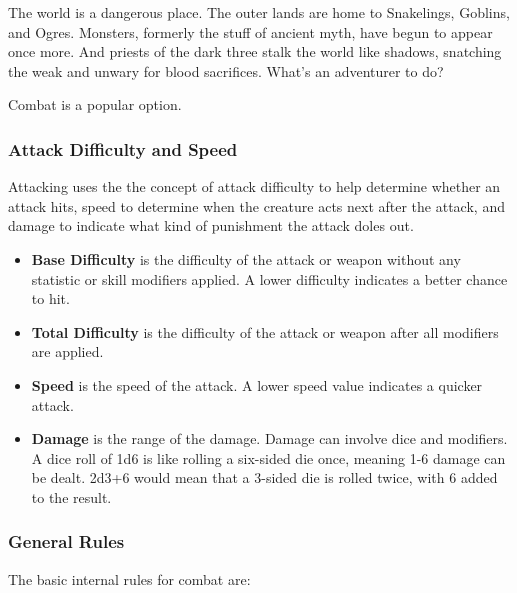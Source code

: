 The world is a dangerous place.  The outer lands are home to Snakelings,
Goblins, and Ogres.  Monsters, formerly the stuff of ancient myth, have
begun to appear once more.  And priests of the dark three stalk the world
like shadows, snatching the weak and unwary for blood sacrifices.  What's
an adventurer to do?

Combat is a popular option.

\subsubsection{Attack Difficulty and Speed}

Attacking uses the the concept of attack difficulty to help determine whether
an attack hits, speed to determine when the creature acts next after the 
attack, and damage to indicate what kind of punishment the attack doles out.

\begin{itemize}
\item {\bf Base Difficulty} is the difficulty of the attack or weapon
without any statistic or skill modifiers applied.  A lower difficulty
indicates a better chance to hit.
\item {\bf Total Difficulty} is the difficulty of the attack or weapon
after all modifiers are applied.
\item {\bf Speed} is the speed of the attack.  A lower speed value
indicates a quicker attack.
\item {\bf Damage} is the range of the damage.  Damage can involve dice
and modifiers.  A dice roll of 1d6 is like rolling a six-sided die once,
meaning 1-6 damage can be dealt.  2d3+6 would mean that a 3-sided die
is rolled twice, with 6 added to the result.
\end{itemize}

\subsubsection{General Rules}

The basic internal rules for combat are:

